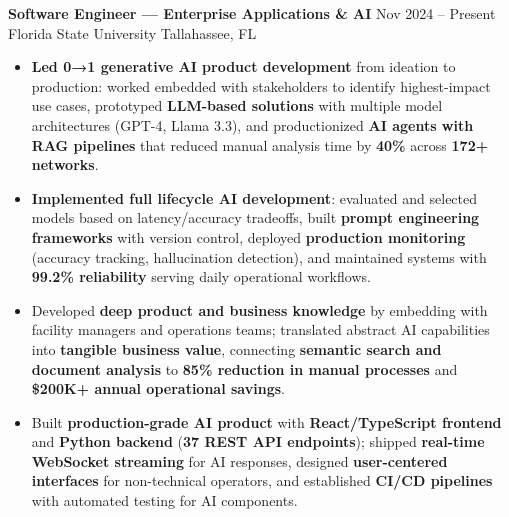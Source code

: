 \documentclass[letterpaper,10pt]{article}
\newcommand{\resumeItem}[1]{\item\small #1}
\newcommand{\resumeSubheading}[4]{
  \vspace{6pt}
  \noindent
  \textbf{#1} \hfill {\footnotesize #2} \\
  [-1pt]
  \noindent
  \small #3 \hfill {\small #4}
  \vspace{3pt}
}
\newcommand{\resumeItemsStart}{\vspace{-2pt}\begin{itemize}}
\newcommand{\resumeItemsEnd}{\end{itemize}\vspace{6pt}}
\begin{document}
\resumeSubheading
{Software Engineer — Enterprise Applications \& AI}{Nov 2024 -- Present}
{Florida State University}{Tallahassee, FL}
\resumeItemsStart
\resumeItem{\textbf{Led 0→1 generative AI product development} from ideation to production: worked embedded with stakeholders to identify highest-impact use cases, prototyped \textbf{LLM-based solutions} with multiple model architectures (GPT-4, Llama 3.3), and productionized \textbf{AI agents with RAG pipelines} that reduced manual analysis time by \textbf{40\%} across \textbf{172+ networks}.}
\resumeItem{\textbf{Implemented full lifecycle AI development}: evaluated and selected models based on latency/accuracy tradeoffs, built \textbf{prompt engineering frameworks} with version control, deployed \textbf{production monitoring} (accuracy tracking, hallucination detection), and maintained systems with \textbf{99.2\% reliability} serving daily operational workflows.}
\resumeItem{Developed \textbf{deep product and business knowledge} by embedding with facility managers and operations teams; translated abstract AI capabilities into \textbf{tangible business value}, connecting \textbf{semantic search and document analysis} to \textbf{85\% reduction in manual processes} and \textbf{\$200K+ annual operational savings}.}
\resumeItem{Built \textbf{production-grade AI product} with \textbf{React/TypeScript frontend} and \textbf{Python backend} (\textbf{37 REST API endpoints}); shipped \textbf{real-time WebSocket streaming} for AI responses, designed \textbf{user-centered interfaces} for non-technical operators, and established \textbf{CI/CD pipelines} with automated testing for AI components.}
\resumeItemsEnd
\vspace{-12pt}
\end{document}
